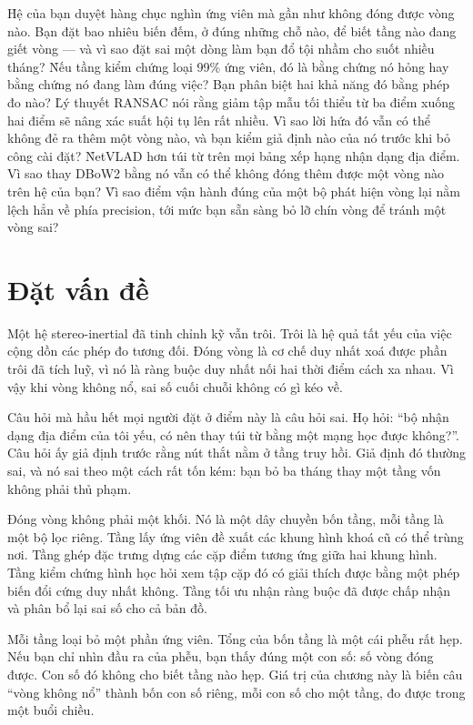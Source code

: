 \documentclass[../../deep_learning.tex]{subfiles}
\begin{document}
\begin{khoigoi}
\h{Hệ của bạn duyệt hàng chục nghìn ứng viên mà gần như không đóng được vòng nào. Bạn đặt bao nhiêu biến đếm, ở đúng những chỗ nào, để biết tầng nào đang giết vòng — và vì sao đặt sai một dòng làm bạn đổ tội nhầm cho suốt nhiều tháng?}
\h{Nếu tầng kiểm chứng loại 99\% ứng viên, đó là bằng chứng nó hỏng hay bằng chứng nó đang làm đúng việc? Bạn phân biệt hai khả năng đó bằng phép đo nào?}
\h{Lý thuyết RANSAC nói rằng giảm tập mẫu tối thiểu từ ba điểm xuống hai điểm sẽ nâng xác suất hội tụ lên rất nhiều. Vì sao lời hứa đó vẫn có thể không đẻ ra thêm một vòng nào, và bạn kiểm giả định nào của nó trước khi bỏ công cài đặt?}
\h{NetVLAD hơn túi từ trên mọi bảng xếp hạng nhận dạng địa điểm. Vì sao thay DBoW2 bằng nó vẫn có thể không đóng thêm được một vòng nào trên hệ của bạn?}
\h{Vì sao điểm vận hành đúng của một bộ phát hiện vòng lại nằm lệch hẳn về phía precision, tới mức bạn sẵn sàng bỏ lỡ chín vòng để tránh một vòng sai?}
\end{khoigoi}

\section{Đặt vấn đề}
Một hệ stereo-inertial đã tinh chỉnh kỹ vẫn trôi. Trôi là hệ quả tất yếu của việc cộng dồn các phép đo tương đối. Đóng vòng là cơ chế duy nhất xoá được phần trôi đã tích luỹ, vì nó là ràng buộc duy nhất nối hai thời điểm cách xa nhau. Vì vậy khi vòng không nổ, sai số cuối chuỗi không có gì kéo về.

Câu hỏi mà hầu hết mọi người đặt ở điểm này là câu hỏi sai. Họ hỏi: ``bộ nhận dạng địa điểm của tôi yếu, có nên thay túi từ bằng một mạng học được không?''. Câu hỏi ấy giả định trước rằng nút thắt nằm ở tầng truy hồi. Giả định đó thường sai, và nó sai theo một cách rất tốn kém: bạn bỏ ba tháng thay một tầng vốn không phải thủ phạm.

Đóng vòng không phải một khối. Nó là một dây chuyền bốn tầng, mỗi tầng là một bộ lọc riêng. Tầng lấy ứng viên đề xuất các khung hình khoá cũ có thể trùng nơi. Tầng ghép đặc trưng dựng các cặp điểm tương ứng giữa hai khung hình. Tầng kiểm chứng hình học hỏi xem tập cặp đó có giải thích được bằng một phép biến đổi cứng duy nhất không. Tầng tối ưu nhận ràng buộc đã được chấp nhận và phân bổ lại sai số cho cả bản đồ.

Mỗi tầng loại bỏ một phần ứng viên. Tổng của bốn tầng là một cái phễu rất hẹp. Nếu bạn chỉ nhìn đầu ra của phễu, bạn thấy đúng một con số: số vòng đóng được. Con số đó không cho biết tầng nào hẹp. Giá trị của chương này là biến câu ``vòng không nổ'' thành bốn con số riêng, mỗi con số cho một tầng, đo được trong một buổi chiều.
\end{document}
